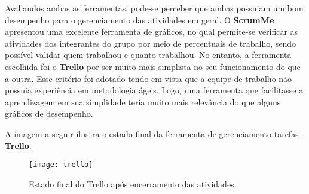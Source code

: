 		Avaliandos ambas as ferramentas, pode-se perceber que ambas possuiam um bom desempenho para o gerenciamento das atividades em geral. O \textbf{ScrumMe} apresentou uma excelente ferramenta de gráficos, no qual permite-se verificar as atividades dos integrantes do grupo por meio de percentuais de trabalho, sendo possível validar quem trabalhou e quanto trabalhou. No entanto, a ferramenta escolhida foi o \textbf{Trello} por ser muito mais simplista no seu funcionamento do que a outra. Esse critério foi adotado tendo em vista que a equipe de trabalho não possuia experiência em metodologia ágeis. Logo, uma ferramenta que facilitasse a aprendizagem em sua simplidade teria muito mais relevância do que alguns gráficos de desempenho.

		A imagem a seguir ilustra o estado final da ferramenta de gerenciamento tarefas - \textbf{Trello}.
		\newpage

		\begin{landscape}
		\begin{figure}[h]
			\centering
			\texttt{[image: trello]}
			\caption[Estado final do Trello após encerramento das atividades]{Estado final do Trello após encerramento das atividades.}
			\label{fig:trello}
		\end{figure}
		\end{landscape}